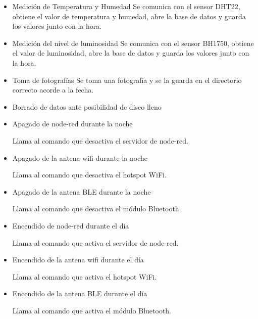 \begin{itemize}
	\item Medición de Temperatura y Humedad
	Se comunica con el sensor DHT22, obtiene el valor de temperatura y humedad, abre la base de datos y guarda los valores junto con la hora.
	\item Medición del nivel de luminosidad
		Se comunica con el sensor BH1750, obtiene el valor de luminosidad, abre la base de datos y guarda los valores junto con la hora.
	\item Toma de fotografías
	Se toma una fotografía y se la guarda en el directorio correcto acorde a la fecha.
	\item Borrado de datos ante posibilidad de disco lleno
	\TBD
	\item Apagado de node-red durante la noche
	
	Llama al comando que desactiva el servidor de node-red.
	\item Apagado de la antena wifi durante la noche

	Llama al comando que desactiva el hotspot WiFi.
	\item Apagado de la antena BLE durante la noche

	Llama al comando que desactiva el m\'odulo Bluetooth.
	\item Encendido de node-red durante el día

	Llama al comando que activa el servidor de node-red.
	\item Encendido de la antena wifi durante el día

	Llama al comando que activa el hotspot WiFi.
	\item Encendido de la antena BLE durante el día

		Llama al comando que activa el m\'odulo Bluetooth.
\end{itemize}